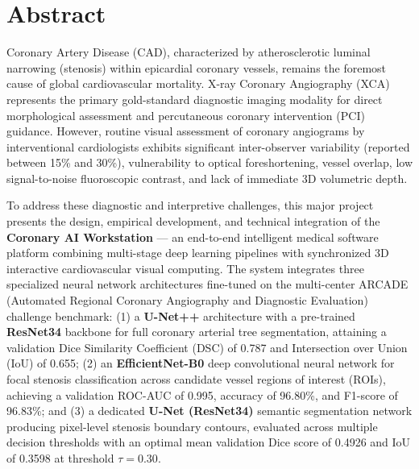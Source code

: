\chapter*{Abstract}

Coronary Artery Disease (CAD), characterized by atherosclerotic luminal narrowing (stenosis) within epicardial coronary vessels, remains the foremost cause of global cardiovascular mortality. X-ray Coronary Angiography (XCA) represents the primary gold-standard diagnostic imaging modality for direct morphological assessment and percutaneous coronary intervention (PCI) guidance. However, routine visual assessment of coronary angiograms by interventional cardiologists exhibits significant inter-observer variability (reported between 15\% and 30\%), vulnerability to optical foreshortening, vessel overlap, low signal-to-noise fluoroscopic contrast, and lack of immediate 3D volumetric depth.

To address these diagnostic and interpretive challenges, this major project presents the design, empirical development, and technical integration of the \textbf{Coronary AI Workstation} --- an end-to-end intelligent medical software platform combining multi-stage deep learning pipelines with synchronized 3D interactive cardiovascular visual computing. The system integrates three specialized neural network architectures fine-tuned on the multi-center ARCADE (Automated Regional Coronary Angiography and Diagnostic Evaluation) challenge benchmark: (1) a \textbf{U-Net++} architecture with a pre-trained \textbf{ResNet34} backbone for full coronary arterial tree segmentation, attaining a validation Dice Similarity Coefficient (DSC) of 0.787 and Intersection over Union (IoU) of 0.655; (2) an \textbf{EfficientNet-B0} deep convolutional neural network for focal stenosis classification across candidate vessel regions of interest (ROIs), achieving a validation ROC-AUC of 0.995, accuracy of 96.80\%, and F1-score of 96.83\%; and (3) a dedicated \textbf{U-Net (ResNet34)} semantic segmentation network producing pixel-level stenosis boundary contours, evaluated across multiple decision thresholds with an optimal mean validation Dice score of 0.4926 and IoU of 0.3598 at threshold $\tau = 0.30$.

